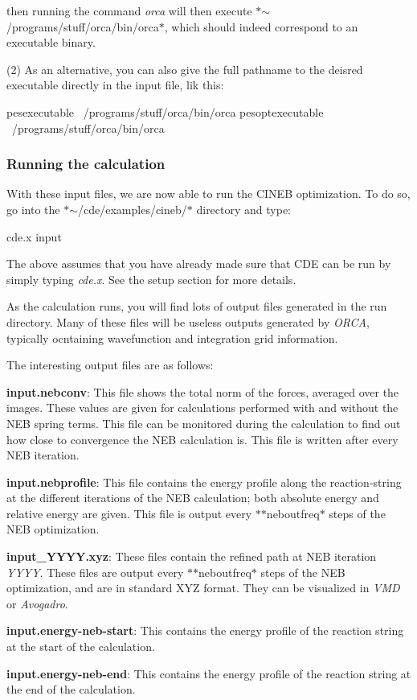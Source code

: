 then running the command {\itshape orca} will then execute $\ast$$\sim$/programs/stuff/orca/bin/orca$\ast$, which should indeed correspond to an executable binary.

(2) As an alternative, you can also give the full pathname to the deisred executable directly in the input file, lik this\+: \begin{DoxyVerb}  pesexecutable ~/programs/stuff/orca/bin/orca
  pesoptexecutable ~/programs/stuff/orca/bin/orca
\end{DoxyVerb}


\subsubsection*{Running the calculation}

With these input files, we are now able to run the C\+I\+N\+EB optimization. To do so, go into the $\ast$$\sim$/cde/examples/cineb/$\ast$ directory and type\+: \begin{DoxyVerb}cde.x input
\end{DoxyVerb}


The above assumes that you have already made sure that C\+DE can be run by simply typing {\itshape cde.\+x}. See the setup section for more details.

As the calculation runs, you will find lots of output files generated in the run directory. Many of these files will be useless outputs generated by {\itshape O\+R\+CA}, typically ocntaining wavefunction and integration grid information.

The interesting output files are as follows\+:


\begin{DoxyItemize}
\item {\bfseries input.\+nebconv}\+: This file shows the total norm of the forces, averaged over the images. These values are given for calculations performed with and without the N\+EB spring terms. This file can be monitored during the calculation to find out how close to convergence the N\+EB calculation is. This file is written after every N\+EB iteration.
\item {\bfseries input.\+nebprofile}\+: This file contains the energy profile along the reaction-\/string at the different iterations of the N\+EB calculation; both absolute energy and relative energy are given. This file is output every $\ast$$\ast$neboutfreq$\ast$ steps of the N\+EB optimization.
\item {\bfseries input\+\_\+\+Y\+Y\+Y\+Y.\+xyz}\+: These files contain the refined path at N\+EB iteration {\itshape Y\+Y\+YY}. These files are output every $\ast$$\ast$neboutfreq$\ast$ steps of the N\+EB optimization, and are in standard X\+YZ format. They can be visualized in {\itshape V\+MD} or {\itshape Avogadro}.
\item {\bfseries input.\+energy-\/neb-\/start}\+: This contains the energy profile of the reaction string at the start of the calculation.
\item {\bfseries input.\+energy-\/neb-\/end}\+: This contains the energy profile of the reaction string at the end of the calculation.
\end{DoxyItemize}

